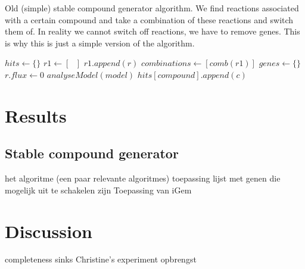 \documentclass[12pt]{report}
\begin{document}
\begin{algorithm}
  \caption{Old (simple) stable compound generator algorithm. We find reactions associated with a certain compound and take a combination of these reactions and switch them of. In reality we cannot switch off reactions, we have to remove genes. This is why this is just a simple version of the algorithm.}\label{alg:scg_old}
  \begin{algorithmic}[1]
        \State $hits \gets \text{\{ \}}$
        \State $r1 \gets [\text{ }]$ 
                \State $r1.append(r)$
            \EndIf
        \EndFor
            \State $combinations \gets [comb(r1)]$
            \State $genes \gets \text{\{ \}}$
                    \State $r.flux \gets 0$
                \EndFor
                \State $analyseModel(model)$
                        \State $hits[compound].append(c)$
                    \EndIf
                \EndIf
            \EndFor
        \EndIf
    \EndProcedure
  \end{algorithmic}
\end{algorithm}



\section{Results}
\subsection{Stable compound generator}
het algoritme (een paar relevante algoritmes)
toepassing lijst met genen die mogelijk uit te schakelen zijn
Toepassing van iGem

\section{Discussion}
completeness
sinks
Christine's experiment
opbrengst
\end{document}
